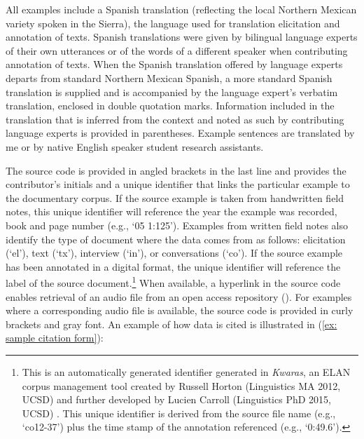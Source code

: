 All examples include a {Spanish} translation (reflecting the local Northern Mexican variety spoken in the Sierra), the language used for translation elicitation and annotation of texts. {Spanish} translations were given by bilingual language experts of their own utterances or of the words of a different speaker when contributing annotation of texts. When the {Spanish} translation offered by language experts departs from standard Northern Mexican {Spanish}, a more standard {Spanish} translation is supplied and is accompanied by the language expert's verbatim translation, enclosed in double quotation marks. Information included in the translation that is inferred from the context and noted as such by contributing language experts is provided in parentheses. Example sentences are translated by me or by native English speaker student research assistants.

The source code is provided in angled brackets in the last line and provides the contributor’s initials and a unique identifier that links the particular example to the documentary corpus. If the source example is taken from handwritten field notes, this unique identifier will reference the year the example was recorded, book and page number (e.g., `05 1:125'). Examples from written field notes also identify the type of document where the data comes from as follows: elicitation (`el'), text (`tx'), interview (`in'), or conversations (`co'). If the source example has been annotated in a digital format, the unique identifier will reference the label of the source document.\footnote{This is an automatically generated identifier generated in \textit{Kwaras}, an ELAN corpus management tool created by Russell Horton (Linguistics MA 2012, UCSD) and further developed by Lucien Carroll (Linguistics PhD 2015, UCSD) \citep{caballero2019accessing}. This unique identifier is derived from the source file name (e.g., ‘co12-37’) plus the time stamp of the annotation referenced (e.g., ‘0:49.6’).} When available, a hyperlink in the source code enables retrieval of an audio file from an open access repository (\citealt{caballero_gabriela_2022_7268366}). For examples where a corresponding audio file is available, the source code is provided in curly brackets and gray font. An example of how data is cited is illustrated in (\ref{ex: sample citation form}):

\ea\label{ex: sample citation form}

